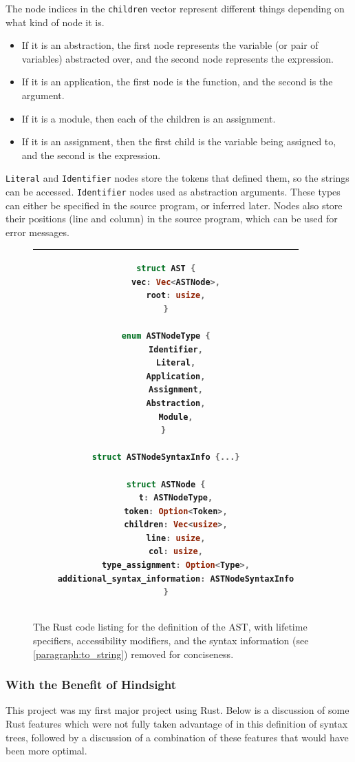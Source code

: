 The node indices in the \verb|children| vector represent different things depending on what kind of node it is. 
\begin{itemize}
    \item If it is an abstraction, the first node represents the variable (or pair of variables) abstracted over, and the second node represents the expression.
    \item If it is an application, the first node is the function, and the second is the argument.
    \item If it is a module, then each of the children is an assignment.
    \item If it is an assignment, then the first child is the variable being assigned to, and the second is the expression.
\end{itemize}

\verb|Literal| and \verb|Identifier| nodes store the tokens that defined them, so the strings can be accessed. \verb|Identifier| nodes used as abstraction arguments. These types can either be specified in the source program, or inferred later. Nodes also store their positions (line and column) in the source program, which can be used for error messages. 

\begin{figure}[t]
    \centering
    \begin{tabular}{c}
    \hline
    \begin{lstlisting}[language=Rust]
struct AST {
    vec: Vec<ASTNode>,
    root: usize,
}

enum ASTNodeType {
    Identifier,
    Literal,
    Application,
    Assignment,
    Abstraction,
    Module,
} 

struct ASTNodeSyntaxInfo {...}

struct ASTNode {
    t: ASTNodeType,
    token: Option<Token>,
    children: Vec<usize>,
    line: usize,
    col: usize,
    type_assignment: Option<Type>,
    additional_syntax_information: ASTNodeSyntaxInfo
}
    \end{lstlisting}
    \\\hline
    \end{tabular}
    \caption{The Rust code listing for the definition of the AST, with lifetime specifiers, accessibility modifiers, and the syntax information (see \ref{paragraph:to_string}) removed for conciseness.}
    \label{fig:ast_lst}
\end{figure}


\subsubsection{With the Benefit of Hindsight} %
This project was my first major project using Rust. Below is a discussion of some Rust features which were not fully taken advantage of in this definition of syntax trees, followed by a discussion of a combination of these features that would have been more optimal. 

